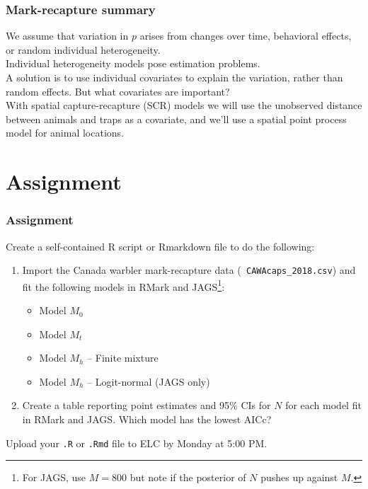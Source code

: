 \documentclass[color=usenames,dvipsnames]{beamer}\usepackage[]{graphicx}\usepackage[]{color}
\begin{document}


\begin{frame}
  \frametitle{Mark-recapture summary}
  We assume that variation in $p$ arises from changes over time,
  behavioral effects, or random individual heterogeneity. \\
  \pause \vfill
  Individual heterogeneity models pose estimation problems. \\
  \pause \vfill
  A solution is to use individual covariates to explain the variation,
  rather than random effects. \pause But what covariates are
  important? \\
  \pause \vfill
  With spatial capture-recapture (SCR) models we will use
  \alert{the unobserved distance between animals and traps} as a
  covariate, and we'll use a spatial point process model for
  animal locations.  
\end{frame}




\section{Assignment}




\begin{frame}[fragile]
  \frametitle{Assignment}
  \small
  Create a self-contained R script or Rmarkdown file to do the
  following: 
  \vfill
  \begin{enumerate}
    \small
    \item Import the Canada warbler mark-recapture data ({\tt
        CAWAcaps\_2018.csv}) and fit the following models in RMark and
      JAGS\footnote{For JAGS, use $M=800$ but note if the posterior of
      $N$ pushes up against $M$.}:
      \begin{itemize}
        \item Model $M_0$
        \item Model $M_t$ 
        \item Model $M_h$ -- Finite mixture
        \item Model $M_h$ -- Logit-normal (JAGS only)
      \end{itemize}
    \item Create a table reporting point estimates and 95\% CIs for
      $N$ for each model fit in RMark and JAGS. Which model has the
      lowest AICc? 
  \end{enumerate}
  \vfill
  Upload your {\tt .R} or {\tt .Rmd} file to ELC by Monday at 5:00 PM. 
\end{frame}
\end{document}
